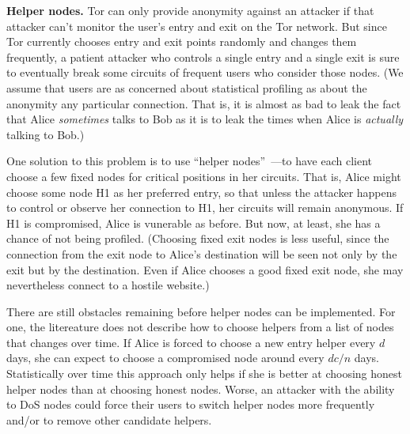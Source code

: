 \documentclass{llncs}
\begin{document}
\medskip
\noindent
{\bf Helper nodes.}
Tor can only provide anonymity against an attacker if that attacker can't
monitor the user's entry and exit on the Tor network.  But since Tor
currently chooses entry and exit points randomly and changes them frequently,
a patient attacker who controls a single entry and a single exit is sure to
eventually break some circuits of frequent users who consider those nodes.
(We assume that users are as concerned about statistical profiling as about
the anonymity any particular connection.  That is, it is almost as bad to
leak the fact that Alice {\it sometimes} talks to Bob as it is to leak the times
when Alice is {\it actually} talking to Bob.)


One solution to this problem is to use ``helper nodes''~\cite{wright02,wright03}---to
have each client choose a few fixed nodes for critical positions in her
circuits.  That is, Alice might choose some node H1 as her preferred
entry, so that unless the attacker happens to control or observe her
connection to H1, her circuits will remain anonymous.  If H1 is compromised,
Alice is vunerable as before.  But now, at least, she has a chance of
not being profiled.
(Choosing fixed exit nodes is less useful, since the connection from the exit
node to Alice's destination will be seen not only by the exit but by the
destination.  Even if Alice chooses a good fixed exit node, she may
nevertheless connect to a hostile website.)

There are still obstacles remaining before helper nodes can be implemented.
For one, the litereature does not describe how to choose helpers from a list
of nodes that changes over time.  If Alice is forced to choose a new entry
helper every $d$ days, she can expect to choose a compromised node around
every $dc/n$ days. Statistically over time this approach only helps
if she is better at choosing honest helper nodes than at choosing
honest nodes.  Worse, an attacker with the ability to DoS nodes could
force their users to switch helper nodes more frequently and/or to remove
other candidate helpers.


%
\end{document}

